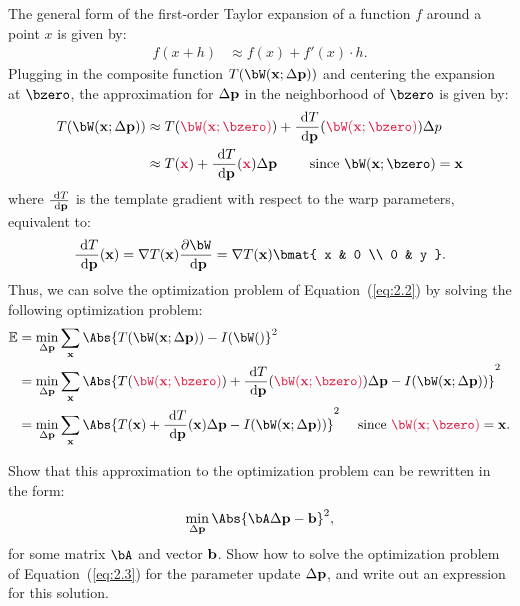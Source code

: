 \begin{problem}
\begin{enumroman}
      \begin{answer}
        The general form of the first-order Taylor expansion of a function
        $f$ around a point $x$ is given by:
        \begin{align*}
          f(x + h) &\approx f(x) + f'(x) \cdot h.
        \end{align*}
        Plugging in the composite function $T(\bW(\bx; \Delta \bp))$ and centering
        the expansion at $\bzero$, the approximation for
        $\Delta \mathbf{p}$ in the neighborhood of $\bzero$ is given by:
        \begin{align*}
          T(\bW(\bx; \Delta \bp)) &\approx
          T(\crim{\bW(\bx; \bzero)}) + \frac{\d T}{\d \bp}(\crim{\bW(\bx; \bzero)}) \Delta p \\
          &\approx T(\crim{\bx}) + \frac{\d T}{\d \bp}(\crim{\bx}) \Delta \bp
          \qquad \text{ since } \bW(\bx; \bzero) = \bx
        \end{align*}
        where $\frac{\text{ d} T}{\text{ d} \mathbf{p}}$ is the template gradient with respect to the warp parameters,
        equivalent to:
        \[
          \frac{\d T}{\d \bp}(\bx) = \nabla T(\bx) \frac{\partial \bW}{\d \bp}
          = \nabla T(\bx) \bmat{ x & 0 \\ 0 & y }.
        \]
        Thus, we can solve the optimization problem of Equation~(\ref{eq:2.2})
        by solving the following optimization problem:
        \begin{align*}
          \mathbb{E} &= \min_{\Delta \bp} \sum_\bx \Abs{T(\bW(\bx; \Delta \bp)) - I(\bW()}^2 \\
                     &= \min_{\Delta \bp} \sum_\bx \Abs{T(\crim{\bW(\bx; \bzero)}) +
                     \frac{\d T}{\d \bp}(\crim{\bW(\bx; \bzero)}) \Delta \bp - I(\bW(\bx; \Delta \bp))}^2 \\
                     &= \min_{\Delta \bp} \sum_\bx \Abs{T(\bx) + \frac{\d T}{\d \bp}(\bx)
                     \Delta \bp - I(\bW(\bx; \Delta \bp))}^2 \quad \text{ since $\crim{\bW(\bx; \bzero)} = \bx$}.
          \label{eq:ans:2.2}
        \end{align*}
      \end{answer}

      \newpage
    \item Show that this approximation to the optimization problem can be rewritten
      in the form:
      \begin{equation}
        \min_{\Delta \bp} \Abs{\bA \Delta \bp - \bb}^2,
        \label{eq:2.3}
      \end{equation}
      for some matrix $\bA$ and vector $\mathbf{b}$.
      Show how to solve the optimization problem of Equation~(\ref{eq:2.3})
      for the parameter update $\Delta \mathbf{p}$, and write out an expression
      for this solution.


\end{enumroman}
\end{problem}
